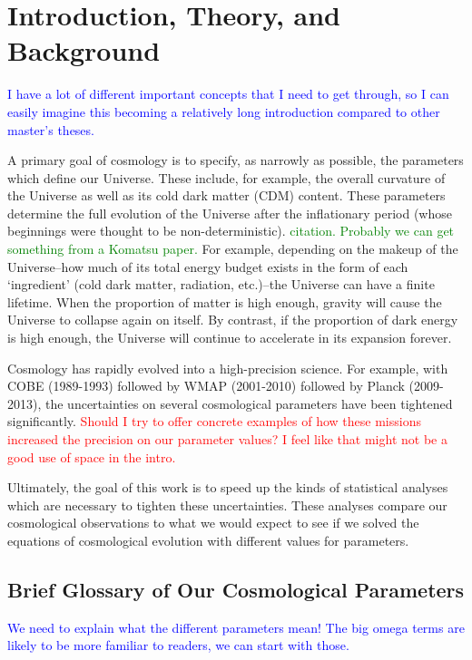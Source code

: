 \chapter{Introduction, Theory, and Background}

\textcolor{blue}{I have a lot of different important concepts that I need to 
get through, so I can easily imagine this becoming a relatively long 
introduction compared to other master's theses.}

A primary goal of cosmology is to specify, as narrowly as possible, the 
parameters which define our Universe. These include, for example, the overall 
curvature of the Universe as well as its cold dark matter (CDM) content. These
parameters determine the full evolution of the Universe after the inflationary
period (whose beginnings were thought to be non-deterministic). 
\textcolor{green}{citation.
Probably we can get something from a Komatsu paper.} For example, depending on
the makeup of the Universe--how much of its total energy budget exists in the
form of each `ingredient' (cold dark matter, radiation, etc.)--the Universe
can have a finite lifetime. When the proportion of matter is high enough,
gravity will cause the Universe to collapse again on itself. By contrast, if
the proportion of dark energy is high enough, the Universe will continue to
accelerate in its expansion forever.

Cosmology has rapidly evolved into a high-precision science. For example, with
COBE (1989-1993) followed by WMAP (2001-2010) followed by Planck (2009-2013),
the uncertainties on several cosmological parameters have been tightened
significantly.
\textcolor{red}{Should I try to offer concrete examples of how these missions
increased the precision on our parameter values? I feel like that might not be
a good use of space in the intro.}

Ultimately, the goal of this work is to speed up the kinds of statistical
analyses which are necessary to tighten these uncertainties.
These analyses compare our cosmological observations to what we
would expect to see if we solved the equations of cosmological evolution with
different values for parameters.

\section{Brief Glossary of Our Cosmological Parameters}
\label{sec: param_glossary}

\textcolor{blue}{We need to explain what the different parameters mean! The
big omega terms are likely to be more familiar to readers, we can start with 
those.}

